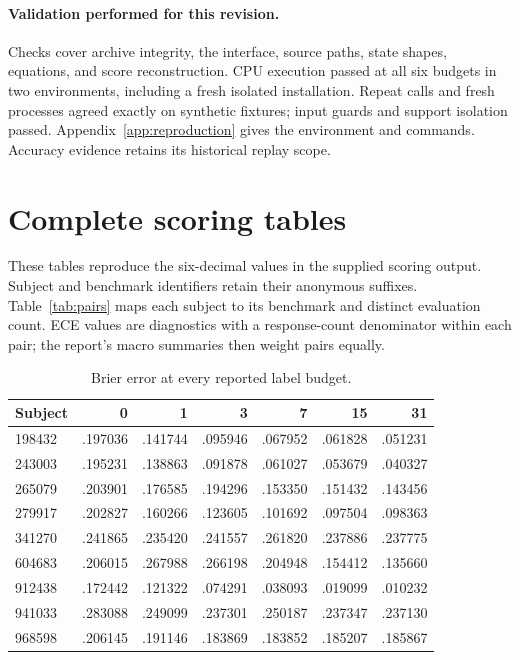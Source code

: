 \paragraph{Validation performed for this revision.}
Checks cover archive integrity, the interface, source paths, state shapes, equations, and score reconstruction. CPU execution passed at all six budgets in two environments, including a fresh isolated installation. Repeat calls and fresh processes agreed exactly on synthetic fixtures; input guards and support isolation passed. Appendix~\ref{app:reproduction} gives the environment and commands. Accuracy evidence retains its historical replay scope.

\clearpage
\section{Complete scoring tables}
\label{app:fullscores}
These tables reproduce the six-decimal values in the supplied scoring output. Subject and benchmark identifiers retain their anonymous suffixes. Table~\ref{tab:pairs} maps each subject to its benchmark and distinct evaluation count. ECE values are diagnostics with a response-count denominator within each pair; the report's macro summaries then weight pairs equally.

\begin{table}[H]
\centering
\caption{Brier error at every reported label budget.}
\small
\begin{tabular}{@{}lrrrrrr@{}}
\toprule
Subject & 0 & 1 & 3 & 7 & 15 & 31 \\
\midrule
198432 & .197036 & .141744 & .095946 & .067952 & .061828 & .051231 \\
243003 & .195231 & .138863 & .091878 & .061027 & .053679 & .040327 \\
265079 & .203901 & .176585 & .194296 & .153350 & .151432 & .143456 \\
279917 & .202827 & .160266 & .123605 & .101692 & .097504 & .098363 \\
341270 & .241865 & .235420 & .241557 & .261820 & .237886 & .237775 \\
604683 & .206015 & .267988 & .266198 & .204948 & .154412 & .135660 \\
912438 & .172442 & .121322 & .074291 & .038093 & .019099 & .010232 \\
941033 & .283088 & .249099 & .237301 & .250187 & .237347 & .237130 \\
968598 & .206145 & .191146 & .183869 & .183852 & .185207 & .185867 \\
\bottomrule
\end{tabular}
\end{table}

